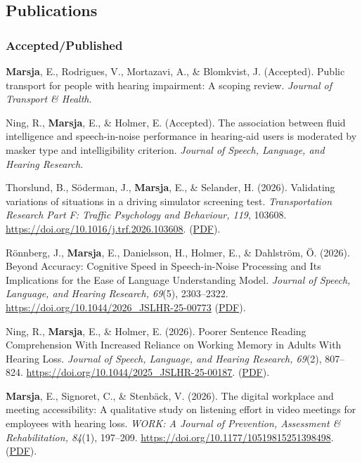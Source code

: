 \documentclass[]{article}
\begin{document}
\subsection{Publications}\label{publications}

\subsubsection{Accepted/Published}\label{acceptedpublished}

\textbf{Marsja}, E., Rodrigues, V., Mortazavi, A., \& Blomkvist, J.
(Accepted). Public transport for people with hearing impairment: A
scoping review. \emph{Journal of Transport \& Health}.

Ning, R., \textbf{Marsja}, E., \& Holmer, E. (Accepted). The association
between fluid intelligence and speech-in-noise performance in
hearing-aid users is moderated by masker type and intelligibility
criterion. \emph{Journal of Speech, Language, and Hearing Research}.

Thorslund, B., Söderman, J., \textbf{Marsja}, E., \& Selander, H.
(2026). Validating variations of situations in a driving simulator
screening test. \emph{Transportation Research Part F: Traffic Psychology
and Behaviour, 119}, 103608.
\url{https://doi.org/10.1016/j.trf.2026.103608}.
(\href{https://drive.google.com/file/d/1EZmLled2Htiit2cb-2r4EO9gfKzZW0tV/view?usp=drive_link}{PDF}).

Rönnberg, J., \textbf{Marsja}, E., Danielsson, H., Holmer, E., \&
Dahlström, Ö. (2026). Beyond Accuracy: Cognitive Speed in
Speech-in-Noise Processing and Its Implications for the Ease of Language
Understanding Model. \emph{Journal of Speech, Language, and Hearing
Research, 69}(5), 2303--2322.
\url{https://doi.org/10.1044/2026_JSLHR-25-00773}
(\href{https://drive.google.com/file/d/1vfpjTRQ7bO8q3RrktHX2Bg9oAf8Vwb6y/view?usp=drive_link}{PDF}).

Ning, R., \textbf{Marsja}, E., \& Holmer, E. (2026). Poorer Sentence
Reading Comprehension With Increased Reliance on Working Memory in
Adults With Hearing Loss. \emph{Journal of Speech, Language, and Hearing
Research, 69}(2), 807--824.
\url{https://doi.org/10.1044/2025_JSLHR-25-00187}.
(\href{https://drive.google.com/file/d/1yltitQ_DCWn9ABYErhnbnPrf_zJUc-Mp/view?usp=drive_link}{PDF}).

\textbf{Marsja}, E., Signoret, C., \& Stenbäck, V. (2026). The digital
workplace and meeting accessibility: A qualitative study on listening
effort in video meetings for employees with hearing loss. \emph{WORK: A
Journal of Prevention, Assessment \& Rehabilitation, 84}(1), 197--209.
\url{https://doi.org/10.1177/10519815251398498}.
(\href{https://drive.google.com/file/d/1iE69QlQEUgeearzNIBXDXHiVZqMj0iHj/view?usp=drive_link}{PDF}).
\end{document}
